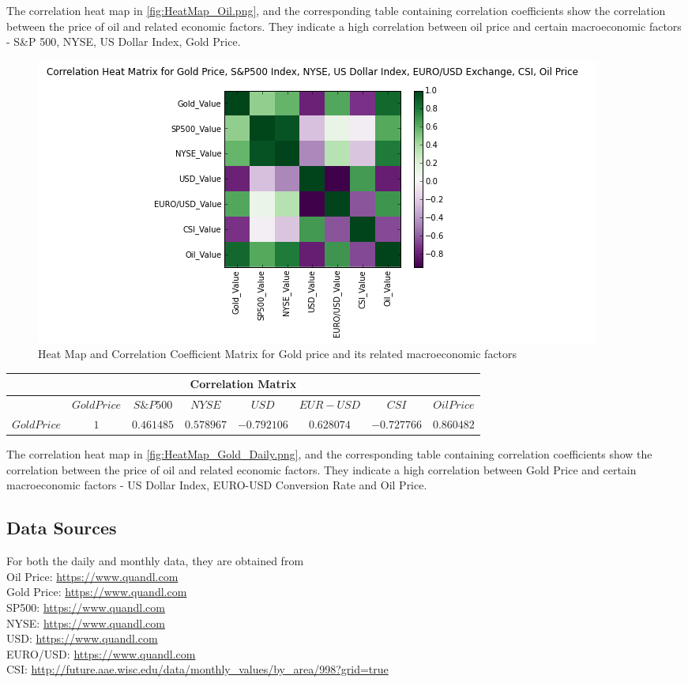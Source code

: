 \documentclass[runningheads]{llncs}
\begin{document}
The correlation heat map in \autoref{fig:HeatMap_Oil.png}, and the corresponding table containing correlation coefficients show the correlation between the price of oil and related economic factors. They indicate a high correlation between oil price and certain macroeconomic factors - S\&P 500, NYSE, US Dollar Index, Gold Price.

\begin{figure}
\centering
\includegraphics[width=\textwidth]{HeatMap_Gold_Daily.png}
\caption{Heat Map and Correlation Coefficient Matrix for Gold price and its related macroeconomic factors}
\label{fig:HeatMap_Gold_Daily.png}
\end{figure}

\begin{center}
\begin{tabular}{|c|c|c|c|c|c|c|c|}
\hline
\multicolumn{8}{|c|}{Correlation Matrix} \\
\hline
$ $ & $Gold Price$ & $ S\&P 500 $ & $ NYSE $ & $ USD $ & $EUR-USD$ & $CSI$ &$Oil Price$ \\ [0.5ex]  \hline
$Gold Price$ & $ 1 $ & $0.461485$ & $0.578967$ & $-0.792106$ & $0.628074$ & $-0.727766$ & $0.860482$ \\ \hline
\end{tabular}
\end{center}

The correlation heat map in \autoref{fig:HeatMap_Gold_Daily.png}, and the corresponding table containing correlation coefficients show the correlation between the price of oil and related economic factors. They indicate a high correlation between Gold Price and certain macroeconomic factors - US Dollar Index, EURO-USD Conversion Rate and Oil Price.


\subsection{Data Sources}
\noindent For both the daily and monthly data, they are obtained from \\
Oil Price: \url{https://www.quandl.com} \\ 
Gold Price: \url{https://www.quandl.com} \\
SP500: \url{https://www.quandl.com} \\
NYSE: \url{https://www.quandl.com} \\
USD: \url{https://www.quandl.com} \\
EURO/USD: \url{https://www.quandl.com} \\
CSI: \url{http://future.aae.wisc.edu/data/monthly_values/by_area/998?grid=true} \\
\end{document}
